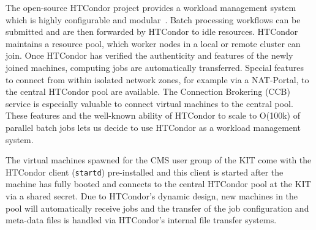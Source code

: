The open-source HTCondor project provides a workload management system which is highly configurable and modular~\cite{HTCondor}. Batch processing workflows can be submitted and are then forwarded by HTCondor to idle resources. HTCondor maintains a resource pool, which worker nodes in a local or remote cluster can join. Once HTCondor has verified the authenticity and features of the newly joined machines, computing jobs are automatically transferred. Special features to connect from within isolated network zones, for example via a NAT-Portal, to the central HTCondor pool are available. The Connection Brokering (CCB) service is especially valuable to connect virtual machines to the central pool. These features and the well-known ability of HTCondor to scale to O(100k) of parallel batch jobs lets us decide to use HTCondor as a workload management system.

The virtual machines spawned for the CMS user group of the KIT come with the HTCondor client (\texttt{startd}) pre-installed and this client is started after the machine has fully booted and connects to the central HTCondor pool at the KIT via a shared secret. Due to HTCondor's dynamic design, new machines in the pool will automatically receive jobs and the transfer of the job configuration and meta-data files is handled via HTCondor's internal file transfer systems.